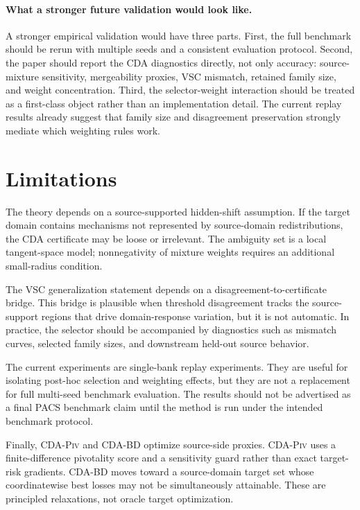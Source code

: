 \documentclass{article}
\theoremstyle{definition}
\newcommand{\piv}{\textup{\textsc{CDA-Piv}}}
\newcommand{\bd}{\textup{\textsc{CDA-BD}}}
\begin{document}
\paragraph{What a stronger future validation would look like.}
A stronger empirical validation would have three parts. First, the full benchmark should be rerun with multiple seeds and a consistent evaluation protocol. Second, the paper should report the CDA diagnostics directly, not only accuracy: source-mixture sensitivity, mergeability proxies, VSC mismatch, retained family size, and weight concentration. Third, the selector-weight interaction should be treated as a first-class object rather than an implementation detail. The current replay results already suggest that family size and disagreement preservation strongly mediate which weighting rules work.

\section{Limitations}

The theory depends on a source-supported hidden-shift assumption. If the target domain contains mechanisms not represented by source-domain redistributions, the CDA certificate may be loose or irrelevant. The ambiguity set is a local tangent-space model; nonnegativity of mixture weights requires an additional small-radius condition.

The VSC generalization statement depends on a disagreement-to-certificate bridge. This bridge is plausible when threshold disagreement tracks the source-support regions that drive domain-response variation, but it is not automatic. In practice, the selector should be accompanied by diagnostics such as mismatch curves, selected family sizes, and downstream held-out source behavior.

The current experiments are single-bank replay experiments. They are useful for isolating post-hoc selection and weighting effects, but they are not a replacement for full multi-seed benchmark evaluation. The results should not be advertised as a final PACS benchmark claim until the method is run under the intended benchmark protocol.

Finally, \piv{} and \bd{} optimize source-side proxies. \piv{} uses a finite-difference pivotality score and a sensitivity guard rather than exact target-risk gradients. \bd{} moves toward a source-domain target set whose coordinatewise best losses may not be simultaneously attainable. These are principled relaxations, not oracle target optimization.
\end{document}

